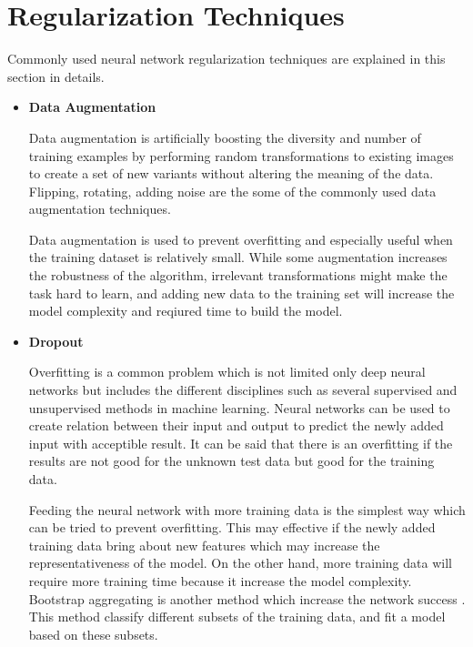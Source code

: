 \section{Regularization Techniques}

        Commonly used neural network regularization techniques are explained in this section in details.

        \begin{itemize}

            \item \textbf{Data Augmentation}

                Data augmentation is artificially boosting the diversity and number of training examples by performing random transformations to existing images to create a set of new variants without altering the meaning of the data.
                Flipping, rotating, adding noise are the some of the commonly used data augmentation techniques.

                Data augmentation is used to prevent overfitting and especially useful when the training dataset is relatively small.
                While some augmentation increases the robustness of the algorithm, irrelevant transformations might make the task hard to learn, and adding new data to the training set will increase the model complexity and reqiured time to build the model.

            \item \textbf{Dropout}

                Overfitting is a common problem which is not limited only deep neural networks but includes the different disciplines such as several supervised and unsupervised methods in machine learning.
                Neural networks can be used to create relation between their input and output to predict the newly added input with acceptible result.
                It can be said that there is an overfitting if the results are not good for the unknown test data but good for the training data.

                Feeding the neural network with more training data is the simplest way which can be tried to prevent overfitting.
                This may effective if the newly added training data bring about new features which may increase the representativeness of the model. On the other hand, more training data will require more training time because it increase the model complexity.
                Bootstrap aggregating is another method which increase the network success \cite{breiman1996bagging}.
                This method classify different subsets of the training data, and fit a model based on these subsets.


\end{itemize}
